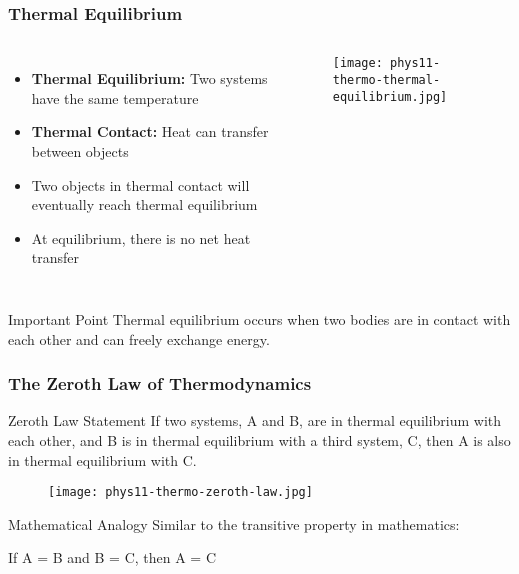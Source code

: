 \documentclass{beamer}
\begin{document}
\begin{frame}
    \frametitle{Thermal Equilibrium}
    \begin{columns}
        \begin{itemize}
            \item \textbf{Thermal Equilibrium:} Two systems have the same temperature
            \item \textbf{Thermal Contact:} Heat can transfer between objects
            \item Two objects in thermal contact will eventually reach thermal equilibrium
            \item At equilibrium, there is no net heat transfer
        \end{itemize}
        
        \begin{center}
            \begin{figure}
                \centering
                \texttt{[image: phys11-thermo-thermal-equilibrium.jpg]}
            \end{figure}
        \end{center}
    \end{columns}
    
    \begin{block}{Important Point}
        Thermal equilibrium occurs when two bodies are in contact with each other and can freely exchange energy.
    \end{block}
\end{frame}

\begin{frame}
    \frametitle{The Zeroth Law of Thermodynamics}
    \begin{block}{Zeroth Law Statement}
        If two systems, A and B, are in thermal equilibrium with each other, and B is in thermal equilibrium with a third system, C, then A is also in thermal equilibrium with C.
    \end{block}
    
    \begin{center}
        \begin{figure}
            \centering
            \texttt{[image: phys11-thermo-zeroth-law.jpg]}
        \end{figure}
    \end{center}
    
    \begin{exampleblock}{Mathematical Analogy}
        Similar to the transitive property in mathematics:
        
        If A = B and B = C, then A = C
    \end{exampleblock}
\end{frame}
\end{document}
